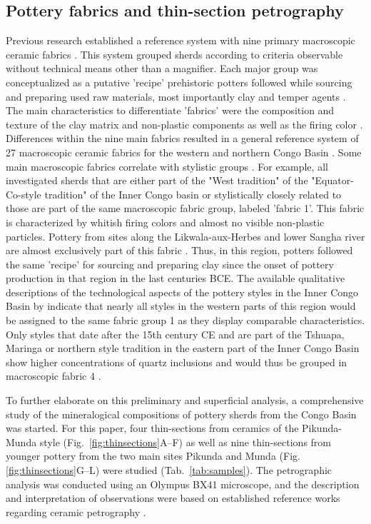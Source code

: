 \documentclass[smallextended,natbib]{svjour3}       %
\begin{document}
\subsection{Pottery fabrics and thin-section petrography}

Previous research established a reference system with nine primary macroscopic ceramic fabrics \cite[60--69]{Seidensticker.2021e}. This system grouped sherds according to criteria observable without technical means other than a magnifier. Each major group was conceptualized as a putative 'recipe' prehistoric potters followed while sourcing and preparing used raw materials, most importantly clay and temper agents \citep[49]{Lange.2006}. The main characteristics to differentiate 'fabrics' \citep[cf.][38--51]{Riemer.2011} were the composition and texture of the clay matrix and non-plastic components as well as the firing color \citep[34]{Nordstrom.1972}. Differences within the nine main fabrics resulted in a general reference system of 27 macroscopic ceramic fabrics for the western and northern Congo Basin \citep[62--65 Tab.~11]{Seidensticker.2021e}. Some main macroscopic fabrics correlate with stylistic groups \cite[69 Tab.~12]{Seidensticker.2021e}. For example, all investigated sherds that are either part of the "West tradition" of the "Equator-Co-style tradition" of the Inner Congo basin \citep[221--222 Fig.~4]{Wotzka.1995} or stylistically closely related to those are part of the same macroscopic fabric group, labeled 'fabric 1'. This fabric is characterized by whitish firing colors and almost no visible non-plastic particles. Pottery from sites along the Likwala-aux-Herbes and lower Sangha river are almost exclusively part of this fabric \cite[67 Fig.~21]{Seidensticker.2021e}. Thus, in this region, potters followed the same 'recipe' for sourcing and preparing clay since the onset of pottery production in that region in the last centuries BCE. The available qualitative descriptions of the technological aspects of the pottery styles in the Inner Congo Basin by \citet[59--210]{Wotzka.1995} indicate that nearly all styles in the western parts of this region would be assigned to the same fabric group 1 as they display comparable characteristics. Only styles that date after the 15th century CE and are part of the Tshuapa, Maringa or northern style tradition in the eastern part of the Inner Congo Basin show higher concentrations of quartz inclusions and would thus be grouped in macroscopic fabric 4 \citep[62--65 Tab.~11]{Seidensticker.2021e}.

To further elaborate on this preliminary and superficial analysis, a comprehensive study of the mineralogical compositions of pottery sherds from the Congo Basin was started. For this paper, four thin-sections from ceramics of the Pikunda-Munda style (Fig.~\ref{fig:thinsections}A--F) as well as nine thin-sections from younger pottery from the two main sites Pikunda and Munda (Fig.\ref{fig:thinsections}G--L) were studied (Tab.~\ref{tab:samples}). The petrographic analysis was conducted using an Olympus BX41 microscope, and the description and interpretation of observations were based on established reference works regarding ceramic petrography \citep{MacKenzie.2017,Quinn.2022}. 
\end{document}
